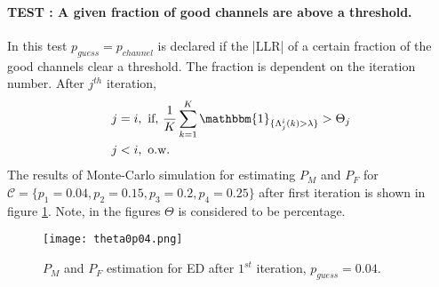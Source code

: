 \documentclass[
11pt, %
a4paper, %
oneside, %
headinclude,footinclude, %
BCOR5mm, %
]{scrartcl}
\begin{document}
\paragraph{TEST : A given fraction of good channels are above a threshold.}  
In this test $p_{guess}=p_{channel}$ is declared if the |LLR| of a certain fraction of the good channels clear a threshold. The fraction is dependent on the iteration number. After $j^{th}$ iteration,
\begin{align*}  
j &=i,
 \text{   if, } \frac{1}{K}\sum^K_{k=1} \mathbbm{1}_{\{\Lambda_{j}^i(k) > \lambda\}} > \Theta_j \\
j & < i,  \text{ o.w. }
\end{align*} 
The results of Monte-Carlo simulation for estimating $P_M$ and $P_F$ for $\mathcal{C}=\{p_1=0.04,p_2=0.15,p_3=0.2,p_4=0.25\}$ after first iteration is shown in figure \ref{fig:theta1}. Note, in the figures $\Theta$ is considered to be percentage.
\begin{figure}[h!]
 \begin{center}
    \texttt{[image: theta0p04.png]}
  \end{center}
  \caption{$P_M$ and $P_F$ estimation for ED after $1^{st}$ iteration, $p_{guess}=0.04$.}
  \label{fig:theta1}
\end{figure}
\end{document}
